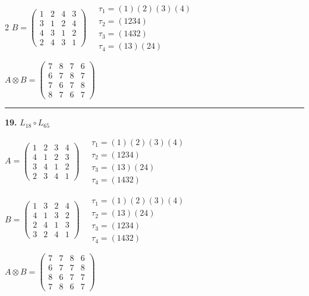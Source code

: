 \begin{multicols}{2}
$B = \begin{pmatrix} 1 & 2 & 4 & 3 \\ 3 & 1 & 2 & 4 \\ 4 & 3 & 1 & 2 \\ 2 & 4 & 3 & 1 \end{pmatrix} \quad \begin{matrix} \tau_{1}=(1)(2)(3)(4) \\ \tau_{2}=(1 2 3 4) \\ \tau_{3}=(1 4 3 2) \\ \tau_{4}=(1 3)(2 4) \end{matrix}$

$A \otimes B = \begin{pmatrix} 7 & 8 & 7 & 6 \\ 6 & 7 & 8 & 7 \\ 7 & 6 & 7 & 8 \\ 8 & 7 & 6 & 7 \end{pmatrix}$

\vspace{0.3em}
\hrule
\vspace{0.3em}

\noindent\textbf{19.} $L_{18} \circ L_{65}$

$A = \begin{pmatrix} 1 & 2 & 3 & 4 \\ 4 & 1 & 2 & 3 \\ 3 & 4 & 1 & 2 \\ 2 & 3 & 4 & 1 \end{pmatrix} \quad \begin{matrix} \tau_{1}=(1)(2)(3)(4) \\ \tau_{2}=(1 2 3 4) \\ \tau_{3}=(1 3)(2 4) \\ \tau_{4}=(1 4 3 2) \end{matrix}$

$B = \begin{pmatrix} 1 & 3 & 2 & 4 \\ 4 & 1 & 3 & 2 \\ 2 & 4 & 1 & 3 \\ 3 & 2 & 4 & 1 \end{pmatrix} \quad \begin{matrix} \tau_{1}=(1)(2)(3)(4) \\ \tau_{2}=(1 3)(2 4) \\ \tau_{3}=(1 2 3 4) \\ \tau_{4}=(1 4 3 2) \end{matrix}$

$A \otimes B = \begin{pmatrix} 7 & 7 & 8 & 6 \\ 6 & 7 & 7 & 8 \\ 8 & 6 & 7 & 7 \\ 7 & 8 & 6 & 7 \end{pmatrix}$


\end{multicols}
